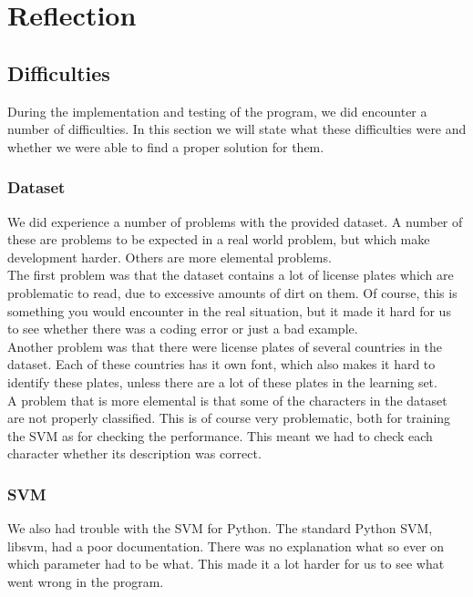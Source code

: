 \documentclass[a4paper]{article}
\begin{document}
\section{Reflection}

\subsection{Difficulties}

During the implementation and testing of the program, we did encounter a
number of difficulties. In this section we will state what these difficulties
were and whether we were able to find a proper solution for them.

\subsubsection*{Dataset}

We did experience a number of problems with the provided dataset. A number of
these are problems to be expected in a real world problem, but which make
development harder. Others are more elemental problems.\\
The first problem was that the dataset contains a lot of license plates which
are problematic to read, due to excessive amounts of dirt on them. Of course,
this is something you would encounter in the real situation, but it made it
hard for us to see whether there was a coding error or just a bad example.\\
Another problem was that there were license plates of several countries in
the dataset. Each of these countries has it own font, which also makes it
hard to identify these plates, unless there are a lot of these plates in the
learning set.\\
A problem that is more elemental is that some of the characters in the dataset
are not properly classified. This is of course very problematic, both for
training the SVM as for checking the performance. This meant we had to check
each character whether its description was correct.

\subsubsection*{SVM}

We also had trouble with the SVM for Python. The standard Python SVM, libsvm,
had a poor documentation. There was no explanation what so ever on which
parameter had to be what. This made it a lot harder for us to see what went
wrong in the program.
\end{document}

